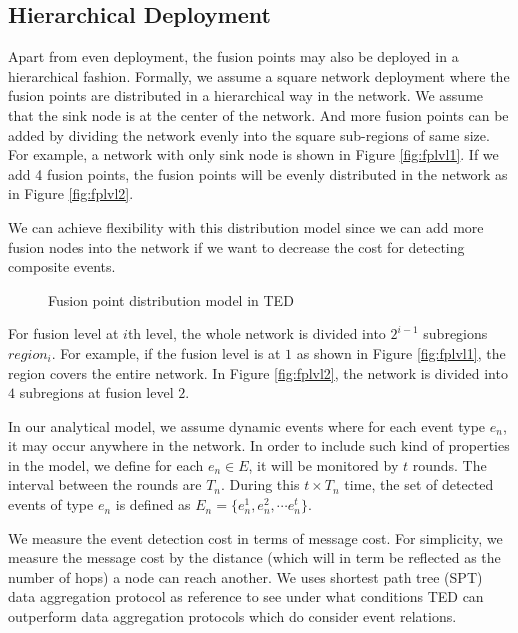 \subsection{Hierarchical Deployment}
Apart from even deployment, the fusion points may also be deployed in a hierarchical fashion. Formally, we assume a square network deployment where the fusion points are distributed in a hierarchical way in the network. We assume that the sink node is at the center of the network. And more fusion points can be added by dividing the network evenly into the square sub-regions of same size. For example, a network with only sink node is shown in Figure \ref{fig:fplvl1}. If we add 4 fusion points, the fusion points will be evenly distributed in the network as in Figure \ref{fig:fplvl2}.

We can achieve flexibility with this distribution model since we can add more fusion nodes into the network if we want to decrease the cost for detecting composite events.

\begin{figure}
\centering
{}
\caption{Fusion point distribution model in TED}
\label{fig:fplvl1-2}
\end{figure}

For fusion level at \(i\)th level, the whole network is divided into \(2^{i-1}\) subregions \(region_i\). For example, if the fusion level is at \(1\) as shown in Figure \ref{fig:fplvl1}, the region covers the entire network. In Figure \ref{fig:fplvl2}, the network is divided into \(4\) subregions at fusion level \(2\).

In our analytical model, we assume dynamic events where for each event type \(e_n\), it may occur anywhere in the network. In order to include such kind of properties in the model, we define for each \(e_n \in E\), it will be monitored by \(t\) rounds. The interval between the rounds are \(T_n\). During this \(t\times T_n\) time, the set of detected events of type \(e_n\) is defined as \(E_n=\{e_n^1, e_n^2, \cdots e_n^t\}\).

We measure the event detection cost in terms of message cost. For simplicity, we measure the message cost by the distance (which will in term be reflected as the number of hops) a node can reach another. We uses shortest path tree (SPT) data aggregation protocol \cite{impactaggregation} as reference to see under what conditions TED can outperform data aggregation protocols which do consider event relations.

